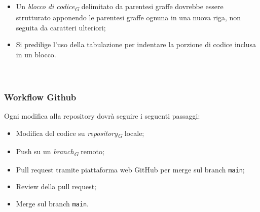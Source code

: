 \documentclass[a4paper, 12pt]{article}
\begin{document}
\begin{itemize}
    \item Un \textit{blocco di codice\textsubscript{G}} delimitato da parentesi graffe dovrebbe essere strutturato apponendo le parentesi graffe ognuna in una nuova riga, non seguita da caratteri ulteriori;
    \item Si predilige l'uso della tabulazione per indentare la porzione di codice inclusa in un blocco.
\paragraph{}\\
\end{itemize}

\subsubsection{Workflow Github}

Ogni modifica alla repository dovrà seguire i seguenti passaggi:
\begin{itemize}
\item Modifica del codice su \textit{repository\textsubscript{G}} locale;
\item Push su un \textit{branch\textsubscript{G}} remoto;
\item Pull request tramite piattaforma web GitHub per merge sul branch \texttt{main};
\item Review della pull request;
\item Merge sul branch \texttt{main}.
\end{itemize}
\end{document}
